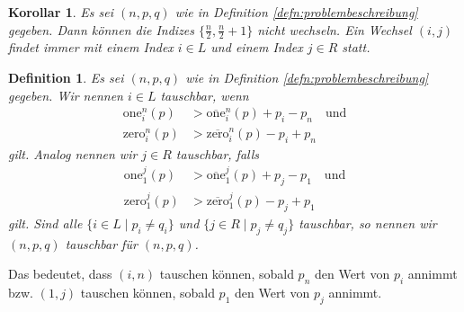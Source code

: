\documentclass[12pt]{article}
\newtheorem{defn}[thm]{Definition}
\newtheorem{cor}[thm]{Korollar}
\begin{document}
\begin{cor}
Es sei $(n, p, q)$ wie in Definition \ref{defn:problembeschreibung} gegeben. Dann können die Indizes $\{\frac{n}{2}, \frac{n}{2}+1 \}$ nicht wechseln. Ein Wechsel $(i, j)$ findet immer mit einem Index $i\in L$ und einem Index $j\in R$ statt.
\label{cor:Wechsel nur aus L und R}
\end{cor}


\begin{defn}
Es sei $(n, p, q)$ wie in Definition \ref{defn:problembeschreibung} gegeben. Wir nennen $i\in L$ tauschbar, wenn 
\begin{align}
\mathrm{one}_i^{n}(p)
&> 
\overline{\mathrm{one}}_i^{n}(p)
+
p_i-p_n
\quad\textrm{und}
\label{eq:Bedingung i und n tauschbar -> ones greater}
\\
\mathrm{zero}_i^{n}(p)
&> 
\overline{\mathrm{zero}}_i^{n}(p)
-
p_i+p_n
\label{eq:Bedingung i und n tauschbar -> zeros greater}
\end{align}
gilt. Analog nennen wir $j\in R$ tauschbar, falls
\begin{align}
\mathrm{one}_1^{j}(p)
&> 
\overline{\mathrm{one}}_1^{j}(p)
+
p_j-p_1
\quad\textrm{und}
\label{eq:Bedingung 1 und j tauschbar -> ones greater}
\\
\mathrm{zero}_1^{j}(p)
&> 
\overline{\mathrm{zero}}_1^{j}(p)
-
p_j+p_1
\label{eq:Bedingung 1 und j tauschbar -> zeroes greater}
\end{align}
gilt.
Sind alle $\{i\in L \mid p_i\neq q_i\}$ und $\{j\in R \mid p_j\neq q_j\}$ tauschbar, so nennen wir $(n, p, q)$ tauschbar für $(n, p, q)$.
\end{defn}
\noindent Das bedeutet, dass $(i, n)$ tauschen können, sobald $p_n$ den Wert von $p_i$ annimmt bzw. $(1, j)$ tauschen können, sobald $p_1$ den Wert von $p_j$ annimmt. 
\end{document}
